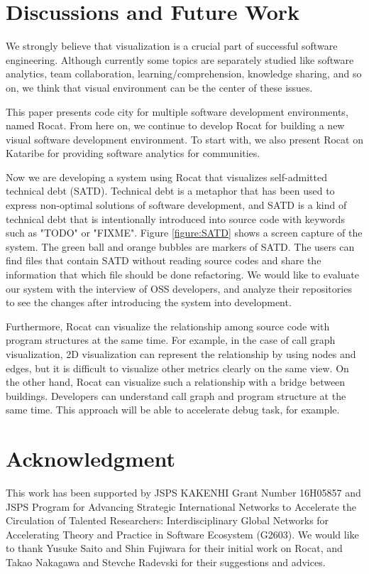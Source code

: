 \documentclass[conference]{IEEEtran}
\newcommand{\figref}[1]{Figure \ref{#1}}
\begin{document}
\section{Discussions and Future Work}
We strongly believe that visualization is a crucial part of successful software engineering.
Although currently some topics are separately studied like software analytics, team collaboration, learning/comprehension, knowledge sharing, and so on, we think that visual environment can be the center of these issues.

This paper presents code city for multiple software development environments, named \textsf{Rocat}.
From here on, we continue to develop \textsf{Rocat} for building a new visual software development environment.
To start with, we also present \textsf{Rocat} on \textsf{Kataribe} for providing software analytics for communities.

Now we are developing a system using \textsf{Rocat} that visualizes self-admitted technical debt (SATD).
Technical debt is a metaphor that has been used to express non-optimal solutions of software development, and SATD is a kind of technical debt that is intentionally introduced into source code with keywords such as "TODO" or "FIXME"\cite{6976075}.
\figref{figure:SATD} shows a screen capture of the system.
The green ball and orange bubbles are markers of SATD.
The users can find files that contain SATD without reading source codes and share the information that which file should be done refactoring.
We would like to evaluate our system with the interview of OSS developers, and analyze their repositories to see the changes after introducing the system into development.

Furthermore, \textsf{Rocat} can visualize the relationship among source code with program structures at the same time.
For example, in the case of call graph visualization, 2D visualization can represent the relationship by using nodes and edges, but it is difficult to visualize other metrics clearly on the same view.
On the other hand, \textsf{Rocat} can visualize such a relationship with a bridge between buildings.
Developers can understand call graph and program structure at the same time.
This approach will be able to accelerate debug task, for example.


\section*{Acknowledgment}
This work has been supported by JSPS KAKENHI Grant Number 16H05857 and JSPS Program for Advancing Strategic International Networks to Accelerate the Circulation of Talented Researchers: Interdisciplinary Global Networks for Accelerating Theory and Practice in Software Ecosystem (G2603).
We would like to thank Yusuke Saito and Shin Fujiwara for their initial work on \textsf{Rocat}, and Takao Nakagawa and Stevche Radevski for their suggestions and advices.





\end{document}

